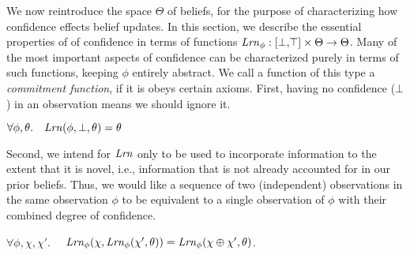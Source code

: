 We now reintroduce the space $\Theta$ of beliefs, 
	for the purpose of characterizing how confidence effects belief updates. 
In this section, we describe the essential properties 
	of of confidence in terms of functions
	$\mathit{Lrn}_\phi : [\bot,\!\top] \times \Theta \to \Theta$. 
Many of the most important aspects of confidence can be characterized purely in terms of such functions, keeping $\phi$ entirely abstract.
We call a function of this type a \emph{commitment function}, if it is obeys certain axioms.
%
%
First, having no confidence ($\bot$) in an observation
	means we should ignore it. 

\begin{LrnAxioms}
    \item
		$
		\forall \phi,\theta.\quad
		\mathit{Lrn}(\phi,\bot, \theta) = \theta
		$
        \label{ax:zero}
\end{LrnAxioms}

Second, we intend for $\mathit{Lrn}$ only to be used to incorporate information to the extent that it is novel,
i.e., information that is not already accounted for in our prior beliefs.
%
Thus, we would like a sequence of two (independent)
observations in the same observation $\phi$ to
be equivalent to a single observation of $\phi$ 
with their combined degree of confidence.

\begin{LrnAxioms}
	\item 
	$\forall \phi, \chi,\chi'.\quad$
    $\mathit{Lrn}_\phi(\chi, \mathit{Lrn}_\phi(\chi', \theta)) =  \mathit{Lrn}_\phi( \chi\oplus\chi',\theta)$.
        \label{ax:combinativity}
\end{LrnAxioms}


